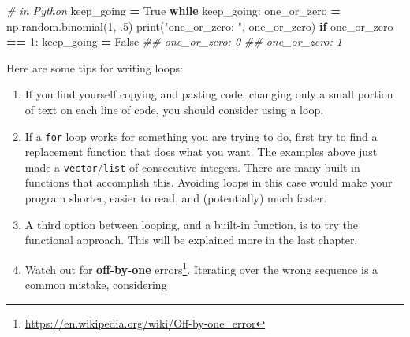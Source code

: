 \documentclass[
  12pt,
  krantz2]{krantz}
\makeatletter
\newenvironment{Shaded}{\begin{snugshade}}{\end{snugshade}}
\newcommand{\BuiltInTok}[1]{#1}
\newcommand{\CommentTok}[1]{\textcolor[rgb]{0.37,0.37,0.37}{\textit{#1}}}
\newcommand{\ControlFlowTok}[1]{\textcolor[rgb]{0.27,0.27,0.27}{\textbf{#1}}}
\newcommand{\DecValTok}[1]{\textcolor[rgb]{0.06,0.06,0.06}{#1}}
\newcommand{\FloatTok}[1]{\textcolor[rgb]{0.06,0.06,0.06}{#1}}
\newcommand{\NormalTok}[1]{#1}
\newcommand{\OperatorTok}[1]{\textcolor[rgb]{0.43,0.43,0.43}{\textbf{#1}}}
\newcommand{\StringTok}[1]{\textcolor[rgb]{0.5,0.5,0.5}{#1}}
\newcommand{\VariableTok}[1]{\textcolor[rgb]{0,0,0}{#1}}
\providecommand{\tightlist}{%
  \setlength{\itemsep}{0pt}\setlength{\parskip}{0pt}}
\renewcommand{\href}[2]{#2\footnote{\url{#1}}}
\newenvironment{kframe}{%
\medskip{}
\setlength{\fboxsep}{.8em}
 \def\at@end@of@kframe{}%
 \ifinner\ifhmode%
  \def\at@end@of@kframe{\end{minipage}}%
  \begin{minipage}{\columnwidth}%
 \fi\fi%
 \def\FrameCommand##1{\hskip\@totalleftmargin \hskip-\fboxsep
 \colorbox{shadecolor}{##1}\hskip-\fboxsep
     \hskip-\linewidth \hskip-\@totalleftmargin \hskip\columnwidth}%
 \MakeFramed {\advance\hsize-\width
   \@totalleftmargin\z@ \linewidth\hsize
   \@setminipage}}%
 {\par\unskip\endMakeFramed%
 \at@end@of@kframe}
\renewenvironment{Shaded}{\begin{kframe}}{\end{kframe}}
\makeatother
\begin{document}
\begin{Shaded}
\begin{Highlighting}[]
\CommentTok{\# in Python}
\NormalTok{keep\_going }\OperatorTok{=} \VariableTok{True}
\ControlFlowTok{while}\NormalTok{ keep\_going:}
\NormalTok{    one\_or\_zero }\OperatorTok{=}\NormalTok{ np.random.binomial(}\DecValTok{1}\NormalTok{, }\FloatTok{.5}\NormalTok{) }
    \BuiltInTok{print}\NormalTok{(}\StringTok{"one\_or\_zero: "}\NormalTok{, one\_or\_zero)}
    \ControlFlowTok{if}\NormalTok{ one\_or\_zero }\OperatorTok{==} \DecValTok{1}\NormalTok{:}
\NormalTok{        keep\_going }\OperatorTok{=} \VariableTok{False}
\CommentTok{\#\# one\_or\_zero:  0}
\CommentTok{\#\# one\_or\_zero:  1}
\end{Highlighting}
\end{Shaded}

\begin{rmd-caution}

Here are some tips for writing loops:

\begin{enumerate}
\def\labelenumi{\arabic{enumi}.}
\tightlist
\item
  If you find yourself copying and pasting code, changing only a small portion of text on each line of code, you should consider using a loop.
\item
  If a \texttt{for} loop works for something you are trying to do, first try to find a replacement function that does what you want. The examples above just made a \texttt{vector}/\texttt{list} of consecutive integers. There are many built in functions that accomplish this. Avoiding loops in this case would make your program shorter, easier to read, and (potentially) much faster.
\item
  A third option between looping, and a built-in function, is to try the functional approach. This will be explained more in the last chapter.
\item
  Watch out for \href{https://en.wikipedia.org/wiki/Off-by-one_error}{\textbf{off-by-one} errors}. Iterating over the wrong sequence is a common mistake, considering


\end{enumerate}
\end{rmd-caution}
\end{document}
